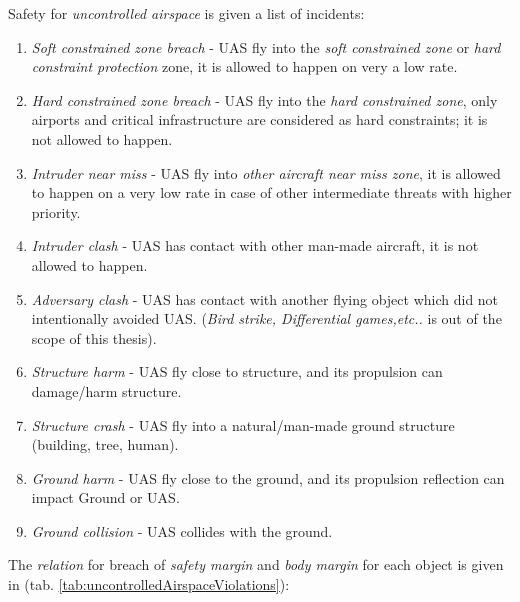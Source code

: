 \noindent Safety for \emph{uncontrolled airspace} is given a list of incidents:
\begin{enumerate}
    \item \emph{Soft constrained zone breach} - UAS fly into the \emph{soft constrained zone} or \emph{hard constraint protection} zone, it is allowed to happen on very a low rate.
    
    \item \emph{Hard constrained zone breach} - UAS fly into the \emph{hard constrained zone}, only airports and critical infrastructure are considered as hard constraints; it is not allowed to happen.  
    
    \item \emph{Intruder near miss} - UAS fly into \emph{other aircraft near miss zone}, it is allowed to happen on a very low rate in case of other intermediate threats with higher priority.
    
    \item \emph{Intruder clash} - UAS has contact with other man-made aircraft, it is not allowed to happen.
    
    \item \emph{Adversary clash} - UAS has contact with another flying object which did not intentionally avoided UAS. (\emph{Bird strike, Differential games,etc..} is out of the scope of this thesis).
    
    \item \emph{Structure harm} - UAS fly close to structure, and its propulsion can damage/harm structure.
    
    \item \emph{Structure crash} - UAS fly into a natural/man-made ground structure (building, tree, human).
    
    \item \emph{Ground harm} - UAS fly close to the ground, and its propulsion reflection can impact Ground or UAS.
    
    \item \emph{Ground collision} - UAS collides with the ground.
\end{enumerate} 

The \emph{relation} for breach of  \emph{safety margin} and \emph{body margin} for each object is given in (tab. \ref{tab:uncontrolledAirspaceViolations}):

